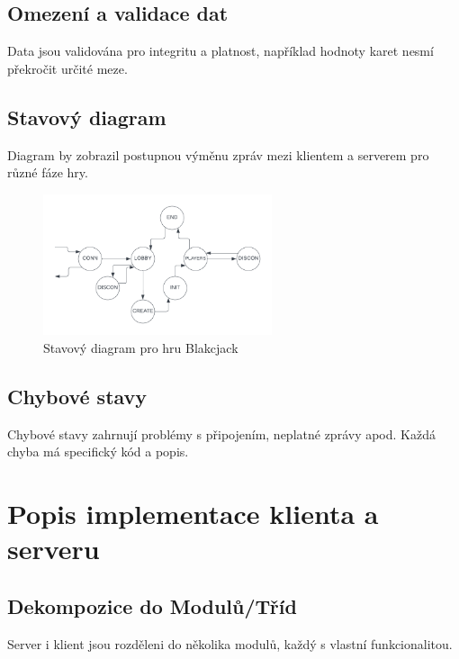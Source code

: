\documentclass{article}
\begin{document}
\subsection{Omezení a validace dat}
Data jsou validována pro integritu a platnost, například hodnoty karet nesmí překročit určité meze.

\subsection{Stavový diagram}
Diagram by zobrazil postupnou výměnu zpráv mezi klientem a serverem pro různé fáze hry.

\begin{figure}[htbp] %
    \centering %
    \includegraphics[width=0.6\textwidth]{img/diagram.png} %
    \caption{Stavový diagram pro hru Blakcjack} %
    \label{fig:obrazek} %
\end{figure}

\subsection{Chybové stavy}
Chybové stavy zahrnují problémy s připojením, neplatné zprávy apod. Každá chyba má specifický kód a popis.

\section{Popis implementace klienta a serveru}
\subsection{Dekompozice do Modulů/Tříd}
Server i klient jsou rozděleni do několika modulů, každý s vlastní funkcionalitou.
\end{document}
